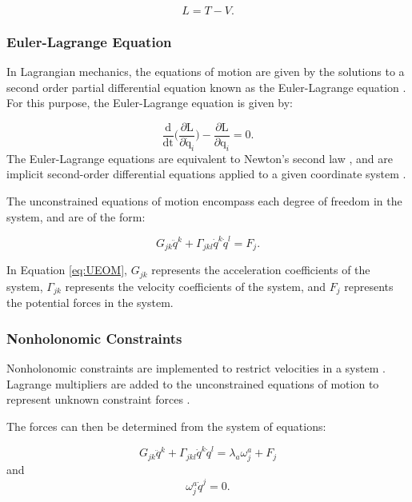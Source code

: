 \begin{equation}
\label{eq:Lagrange}
L = T - V.
\end{equation}

\subsubsection{Euler-Lagrange Equation}

In Lagrangian mechanics, the equations of motion are given by the solutions to a second order partial differential equation known as the Euler-Lagrange equation \cite{Lewis}. 
For this purpose, the Euler-Lagrange equation is given by:

\begin{equation}
\label{eq:EL}
\frac{\text{d}}{\text{dt}} \bigg(\frac{\partial \text{L}}{\partial \dot{\text{q}}_{i}}\bigg) - \frac{\partial \text{L}}{\partial \text{q}_{i}} = 0.
\end{equation}
The Euler-Lagrange equations are equivalent to Newton's second law \cite{NonholonomicPowerpoint}, and are implicit second-order differential equations applied to a given coordinate system \cite{Lewis}.
\par
The unconstrained equations of motion encompass each degree of freedom in the system, and are of the form:

\begin{equation}
\label{eq:UEOM}
G_{jk} \ddot{q}^k + \Gamma_{jkl} \dot{q}^k\dot{q}^l  = F_{j}.
\end{equation}

In Equation \ref{eq:UEOM}, $G_{jk}$ represents the acceleration coefficients of the system, $\Gamma_{jk}$ represents the velocity coefficients of the system, and $F_j$ represents the potential forces in the system.

\subsubsection{Nonholonomic Constraints}

Nonholonomic constraints are implemented to restrict velocities in a system \cite{LagrangeEquations}.
Lagrange multipliers are added to the unconstrained equations of motion to represent unknown constraint forces \cite{ClassicalMechanics}.
\par
The forces can then be determined from the system of equations:

\begin{equation}
\label{eq:CFE}
G_{jk} \ddot{q}^k + \Gamma_{jkl} \dot{q}^k\dot{q}^l  = \lambda_{a}\omega_{j}^{a} + F_{j}
\end{equation}
and
\begin{equation}
\label{eq:CV}
\omega_{j}^{a} \dot{q}^{j} = 0.
\end{equation}

